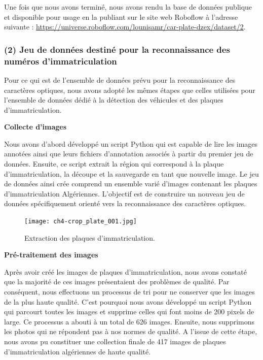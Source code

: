 Une fois que nous avons terminé, nous avons rendu la base de données publique et disponible pour usage en la publiant sur le site web Roboflow à l'adresse suivante : \url{https://universe.roboflow.com/lounisamr/car-plate-dzex/dataset/2}.





\subsubsection {(2) Jeu de données destiné pour la reconnaissance des numéros d'immatriculation }

Pour ce qui est de l'ensemble de données prévu pour la reconnaissance des caractères optiques, nous avons adopté les mêmes étapes que celles utilisées pour l'ensemble de données dédié à la détection des véhicules et des plaques d'immatriculation.

 
\textbf{Collecte d'images}

Nous avons d'abord développé un script Python qui est capable de lire les images annotées ainsi que leurs fichiers d'annotation associés à partir du premier jeu de données. 
Ensuite, ce script extrait la région qui correspond à la plaque d'immatriculation, la découpe et la sauvegarde en tant que nouvelle image. Le jeu de données ainsi crée comprend un ensemble varié d'images contenant les plaques d'immatriculation Algériennes. L'objectif est de construire un nouveau jeu de données spécifiquement orienté vers la reconnaissance des caractères optiques.

\begin{figure}[H]
	\centering
	\texttt{[image: ch4-crop\_plate\_001.jpg]}
	\caption{Extraction des plaques d'immatriculation.}
    \label{fig:CropPlate}
\end{figure}

 
\textbf{Pré-traitement des images}

\par Après avoir créé les images de plaques d’immatriculation, nous avons constaté que la majorité de ces images présentaient des problèmes de qualité. Par conséquent, nous effectuons un processus de tri pour ne conserver que les images de la plus haute qualité. C'est pourquoi nous avons développé un script Python qui parcourt toutes les images et supprime celles qui font moins de 200 pixels de large. Ce processus a abouti à un total de 626 images. Ensuite, nous supprimons les photos qui ne répondent pas à nos normes de qualité. A l’issue de cette étape, nous avons pu constituer une collection finale de 417 images de plaques d’immatriculation algériennes de haute qualité.


